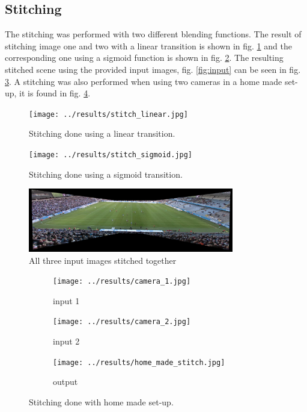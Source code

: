 \subsection{Stitching}
The stitching was performed with two different blending functions.
The result of stitching image one and two with a linear transition is shown in fig. \ref{fig:results:stitching:linear} and the corresponding one using a sigmoid function is shown in fig. \ref{fig:results:stitching:sigmoid}.
The resulting stitched scene using the provided input images, fig. \ref{fig:input} can be seen in fig. \ref{fig:res_stitch}.
A stitching was also performed when using two cameras in a home made set-up, it is found in fig. \ref{fig:results:stitching:homemade}.

\begin{figure}[H]
  \centering
  \texttt{[image: ../results/stitch\_linear.jpg]}
  \caption{Stitching done using a linear transition.}
  \label{fig:results:stitching:linear}
\end{figure}

\begin{figure}[H]
  \centering
  \texttt{[image: ../results/stitch\_sigmoid.jpg]}
  \caption{Stitching done using a sigmoid transition.}
  \label{fig:results:stitching:sigmoid}
\end{figure}

\begin{figure}
	\centering
	\includegraphics[width=0.8\textwidth]{../results/images/res_stitch.PNG}
	\caption{All three input images stitched together}
	\label{fig:res_stitch}
\end{figure}

\begin{figure}
	\centering
	\begin{subfigure}[t]{0.3\textwidth}
		\centering
		\texttt{[image: ../results/camera\_1.jpg]}
		\caption{input 1}
	\end{subfigure}
	\begin{subfigure}[t]{0.3\textwidth}
		\centering
		\texttt{[image: ../results/camera\_2.jpg]}
		\caption{input 2}
	\end{subfigure}
		\begin{subfigure}[t]{0.3\textwidth}
		\centering
                \texttt{[image: ../results/home\_made\_stitch.jpg]}
		\caption{output}
	\end{subfigure}
        \caption{Stitching done with home made set-up.}
	\label{fig:results:stitching:homemade}
\end{figure}
